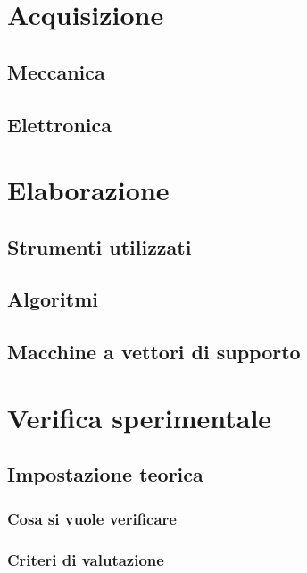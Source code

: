 \documentclass [10pt, a4paper, onecolumn, oneside] {scrreprt}
\numberwithin{endnote}{chapter}
\begin{document}
\chapter{Acquisizione} \label{cap:acquis}
		 \vfill\eject
	\section{Meccanica} \label{sez:meccanica}
		 \vfill
	\section{Elettronica} \label{sez:elettronica}
		 \vfill

\chapter{Elaborazione} \label{cap:elab}
		 \vfill\eject
	\section{Strumenti utilizzati} \label{sez:strumenti}
		 \vfill
	\section{Algoritmi} \label{sez:algoritmi}
		 \vfill
	\section{Macchine a vettori di supporto} \label{sez:svm}
		 \vfill


\chapter{Verifica sperimentale} \label{cap:verifica}
		 \vfill\eject
 \section{Impostazione teorica}
	\subsection{Cosa si vuole verificare} \label{sez:cosa}
		 \vfill
	\subsection{Criteri di valutazione} \label{sez:criteri}
		 \vfill
		 \vfill
\end{document}
